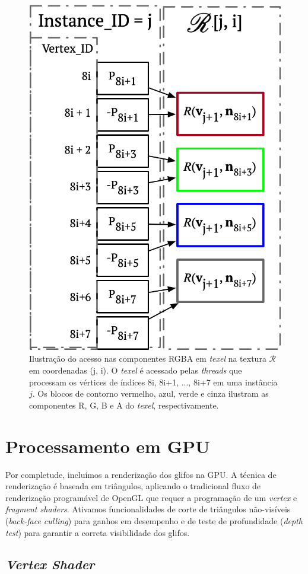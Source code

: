 \begin{figure}[ht]
    \centering
    \includegraphics[width=.45\linewidth, angle=0]{figs/Esquema_Glifo/texel_lookup_6.png}
    \caption{Ilustração do acesso nas componentes RGBA em \textit{texel} na textura $\mathscr{R}$ em coordenadas (j, i). O \textit{texel} é acessado pelas \textit{threads} que processam os vértices de índices 8i, 8i+1, ..., 8i+7 em uma instância $j$. Os blocos de contorno vermelho, azul, verde e cinza ilustram as componentes R, G, B e A do \textit{texel}, respectivamente.}
    \label{fig::texelfetch}
\end{figure}
\section{Processamento em GPU}
\label{sec::processamento_GPU}

Por completude, incluímos a renderização dos glifos na GPU. A técnica de renderização é baseada em triângulos, aplicando o tradicional fluxo de renderização programável de OpenGL que requer a programação de um \textit{vertex} e \textit{fragment shaders}. Ativamos funcionalidades de corte de triângulos não-visíveis (\textit{back-face culling}) para ganhos em desempenho e de teste de profundidade (\textit{depth test}) para garantir a correta visibilidade dos glifos.


\subsection{\textit{Vertex Shader}}
\label{ssec::vertex_shader}

